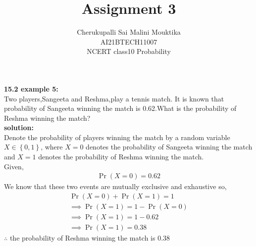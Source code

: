\documentclass[journal,11pt,twocolumn]{IEEEtran}
\begin{document}
    \newtheorem{theorem}{Theorem}[section]
    \newtheorem{problem}{Problem}
    \newtheorem{proposition}{Proposition}[section]
    \newtheorem{lemma}{Lemma}[section]
    \newtheorem{corollary}[theorem]{Corollary}
    \newtheorem{example}{Example}[section]
    \newtheorem{definition}[problem]{Definition}
    \newcommand{\BEQA}{\begin{eqnarray}}
    \newcommand{\EEQA}{\end{eqnarray}}
    \newcommand{\define}{\stackrel{\triangle}{=}}
    \newcommand*\circled[1]{\tikz[baseline=(char.base)]{
        \node[shape=circle,draw,inner sep=2pt] (char) {#1};}}
    
    \providecommand{\mbf}{\mathbf}
    \providecommand{\pr}[1]{\ensuremath{\Pr\left(#1\right)}}
    \providecommand{\qfunc}[1]{\ensuremath{Q\left(#1\right)}}
    \providecommand{\sbrak}[1]{\ensuremath{{}\left[#1\right]}}
    \providecommand{\lsbrak}[1]{\ensuremath{{}\left[#1\right.}}
    \providecommand{\rsbrak}[1]{\ensuremath{{}\left.#1\right]}}
    \providecommand{\brak}[1]{\ensuremath{\left(#1\right)}}
    \providecommand{\lbrak}[1]{\ensuremath{\left(#1\right.}}
    \providecommand{\rbrak}[1]{\ensuremath{\left.#1\right)}}
    \providecommand{\cbrak}[1]{\ensuremath{\left\{#1\right\}}}
    \providecommand{\lcbrak}[1]{\ensuremath{\left\{#1\right.}}
    \providecommand{\rcbrak}[1]{\ensuremath{\left.#1\right\}}}
    \theoremstyle{remark}
    \newtheorem{rem}{Remark}
    
    
\title{Assignment 3}
\author{ Cherukupalli Sai Malini Mouktika\\\normalsize AI21BTECH11007 \\ \vspace*{10pt} \Large NCERT class10 Probability}



\maketitle

\textbf{15.2 example 5: }\\
Two players,Sangeeta and Reshma,play a tennis match. It is known that probability of Sangeeta winning the match is 0.62.What is the probability of Reshma winning the match?\\
\textbf{solution: }\\
Denote the probability of players winning the match by a random variable $X\in \cbrak{0, 1}$, where $X = 0$ denotes the probability of Sangeeta winning the match and $X = 1$ denotes the probability of Reshma winning the match.\\
Given,
\begin{align}
\pr{X = 0} =0.62
\end{align}
We know that these two events are mutually exclusive and exhaustive so,
\begin{align}
\pr{X = 0} + \pr{X = 1} = 1\\
\implies
\pr{X = 1} = 1- \pr{X = 0}\\
\implies
\pr{X = 1} = 1-0.62\\
\implies
\pr{X = 1} = 0.38
\end{align}
$\therefore$ the probability of Reshma winning the match is $0.38$
\end{document}

